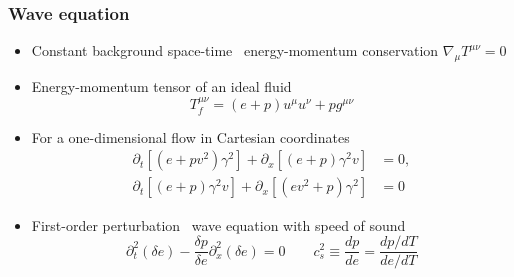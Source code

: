 \begin{frame}
    \frametitle{Wave equation}
    \begin{itemize}
        \item Constant background space-time \textrightarrow \ energy-momentum conservation $\nabla_\mu T^{\mu\nu} = 0$
        \item Energy-momentum tensor of an ideal fluid
        \begin{equation}
            T^{\mu \nu}_f = (e+p) u^\mu u^\nu + p g^{\mu \nu}
        \end{equation}
        \item For a one-dimensional flow in Cartesian coordinates
        \begin{align}
            \partial_t \left[ (e+pv^2) \gamma^2 \right] + \partial_x \left[ (e+p) \gamma^2 v \right] &= 0,
            \label{eq:ep_conservation_1d_1} \\
            \partial_t \left[ (e+p) \gamma^2 v \right] + \partial_x \left[ (ev^2 + p) \gamma^2 \right] &= 0
            \label{eq:ep_conservation_1d_2}
        \end{align}
        \item First-order perturbation \textrightarrow \ wave equation with speed of sound
        \begin{equation}
            \partial_t^2 (\delta e) - \frac{\delta p}{\delta e} \partial_x^2(\delta e) = 0
            \quad \quad
            c_s^2 \equiv \frac{dp}{de} = \frac{dp/dT}{de/dT}
        \end{equation}
    \end{itemize}
\end{frame}

